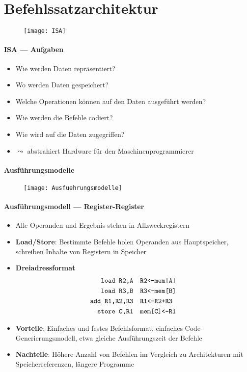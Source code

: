 \section{Befehlssatzarchitektur}
\label{sec:befehlssatzarchitektur}

\begin{figure}[ht]
  \centering
  \texttt{[image: ISA]}
\end{figure}

\paragraph{ISA --- Aufgaben}
\begin{itemize}
	\item Wie werden Daten repräsentiert?
	\item Wo werden Daten gespeichert?
	\item Welche Operationen können auf den Daten ausgeführt werden?
	\item Wie werden die Befehle codiert?
	\item Wie wird auf die Daten zugegriffen?
	\item $\leadsto$ abstrahiert Hardware für den Maschinenprogrammierer
\end{itemize}

\paragraph{Ausführungsmodelle}
\begin{figure}[ht]
  \centering
  \texttt{[image: Ausfuehrungsmodelle]}
  \label{Ausfuehrungsmodelle}
\end{figure}

\paragraph{Ausführungsmodell --- Register-Register}
\begin{itemize}
	\item Alle Operanden und Ergebnis stehen in Allzweckregistern
	\item \textbf{Load/Store}: Bestimmte Befehle holen Operanden aus Hauptspeicher, schreiben Inhalte von Registern in Speicher
	\item \textbf{Dreiadressformat}
	\begin{align*}
		\text{\code{load R2,A}} &\quad \text{\code{R2<-mem[A]}} \\
		\text{\code{load R3,B}} &\quad \text{\code{R3<-mem[B]}} \\
		\text{\code{add R1,R2,R3}} &\quad \text{\code{R1<-R2+R3}} \\
		\text{\code{store C,R1}} &\quad \text{\code{mem[C]<-R1}}
	\end{align*}
	\item \textbf{Vorteile}: Einfaches und festes Befehlsformat, einfaches Code-Generierungsmodell, etwa gleiche Ausführungszeit der Befehle
	\item \textbf{Nachteile}: Höhere Anzahl von Befehlen im Vergleich zu Architekturen mit Speicherreferenzen, längere Programme
\end{itemize}

